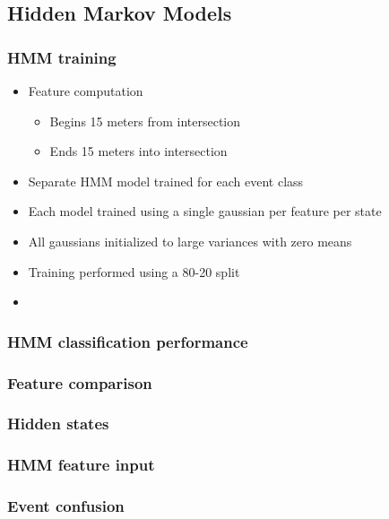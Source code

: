 \documentclass{beamer}
\begin{document}
\subsection[HMM]{Hidden Markov Models}
\begin{frame}
\frametitle{HMM training}
	\begin{itemize}
	  \item Feature computation
	  \begin{itemize}
	    \item Begins 15 meters from intersection
	    \item Ends 15 meters into intersection
	   \end{itemize}
	   \item Separate HMM model trained for each event class
	   \item Each model trained using a single gaussian per feature per state
	   \item All gaussians initialized to large variances with zero means
	   \item Training performed using a 80-20 split
	  \item  
	\end{itemize}
\end{frame}

\begin{frame}

\frametitle{HMM classification performance}

\end{frame}

\begin{frame}

\frametitle{Feature comparison}

\end{frame}

\begin{frame}

\frametitle{Hidden states}

\end{frame}

\begin{frame}

\frametitle{HMM feature input}

\end{frame}

\begin{frame}

\frametitle{Event confusion}

\end{frame}
\end{document}
